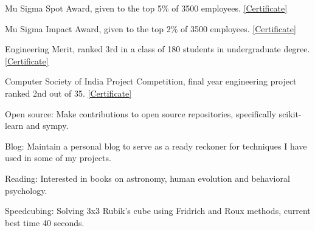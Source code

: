\documentclass[10pt,a4paper]{article}
\begin{document}


\inlineheadsection
  {Mu Sigma Spot Award, }
  {given to the top 5\% of 3500 employees. \href{https://drive.google.com/open?id=1hbCy0f1LU2qj2CIg6ZmP7cXK-BQRKEVm}{[Certificate]}}

\vspace{0.5em}

\inlineheadsection
  {Mu Sigma Impact Award, }
  {given to the top 2\% of 3500 employees. \href{https://drive.google.com/open?id=1jhjtnLzZWuULHREUYim1vh_pRXM6Mupu}{[Certificate]}}

\vspace{0.5em}

\inlineheadsection
  {Engineering Merit, }
  {ranked 3rd in a class of 180 students in undergraduate degree. \href{https://drive.google.com/open?id=17mhdPTfrQNLGxmrIupdCdHSeJdrD8vbR}{[Certificate]}}

\vspace{0.5em}

\inlineheadsection
  {Computer Society of India Project Competition, }
  {final year engineering project ranked 2nd out of 35. \href{https://drive.google.com/open?id=1ufOWnQXRZcLQshJ2VwICYXLTbRV71PKP}{[Certificate]}}

\spacedhrule{1.6em}{-0.4em}



\inlineheadsection
{Open source:}
{Make contributions to open source repositories, specifically scikit-learn and sympy.}

\vspace{0.5em}

\inlineheadsection
{Blog:}
{Maintain a personal blog to serve as a ready reckoner for techniques I have used in some of my projects.}

\vspace{0.5em}

\inlineheadsection
{Reading:}
{Interested in books on astronomy, human evolution and behavioral psychology.}

\vspace{0.5em}

\inlineheadsection
{Speedcubing:}
{Solving 3x3 Rubik's cube using Fridrich and Roux methods, current best time 40 seconds.}
\end{document}
